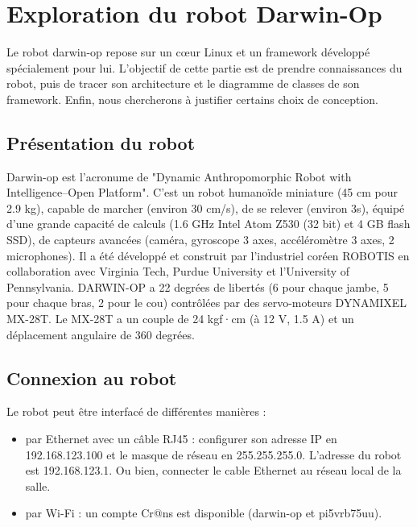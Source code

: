 \documentclass[conference]{IEEEtran}
\begin{document}
\lstset{language=C++}




\section{Exploration du robot Darwin-Op}
\label{sec:exploration}

Le robot darwin-op repose sur un cœur Linux et un \gls{framework} développé spécialement pour lui. L'objectif de cette partie est de prendre connaissances du robot, puis de tracer son architecture et le diagramme de classes de son framework. Enfin, nous chercherons à justifier certains choix de conception.


\subsection{Présentation du robot}

Darwin-op est l'acronume de "Dynamic Anthropomorphic Robot with Intelligence–Open Platform". C'est un robot humanoïde miniature (45 cm pour 2.9 kg), capable de marcher (environ 30 cm/s), de se relever (environ 3s), équipé d'une grande capacité de calculs (1.6 GHz Intel Atom Z530 (32 bit) et 4 GB flash SSD), de capteurs avancées (caméra, gyroscope 3 axes, accéléromètre 3 axes, 2 microphones). Il a été développé et construit par l'industriel coréen ROBOTIS en collaboration avec Virginia Tech, Purdue University et l'University of Pennsylvania. DARWIN-OP a 22 degrées de libertés (6 pour chaque jambe, 5 pour chaque bras, 2 pour le cou) contrôlées par des servo-moteurs DYNAMIXEL MX-28T. Le MX-28T a un couple de 24 kgf·cm (à 12 V, 1.5 A) et un déplacement angulaire de 360 degrées.


\subsection{Connexion au robot}

Le robot peut être interfacé de différentes manières :
\begin{itemize}
    \item  par Ethernet avec un câble RJ45 :
    configurer son adresse IP en 192.168.123.100 et le masque de réseau en 255.255.255.0.
    L'adresse du robot est 192.168.123.1.
    Ou bien,  connecter le cable Ethernet au réseau local de la salle.
    \item  par Wi-Fi : un compte Cr@ns est disponible (darwin-op et pi5vrb75uu).
\end{itemize}
\end{document}
